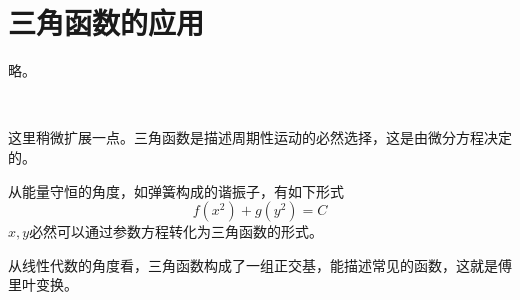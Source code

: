 \section{三角函数的应用}

略。

~

这里稍微扩展一点。三角函数是描述周期性运动的必然选择，这是由微分方程决定的。

从能量守恒的角度，如弹簧构成的谐振子，有如下形式
\[
f\left( x^2 \right) +g\left( y^2 \right) =C
\]
$x,y$必然可以通过参数方程转化为三角函数的形式。

从线性代数的角度看，三角函数构成了一组正交基，能描述常见的函数，这就是傅里叶变换。




